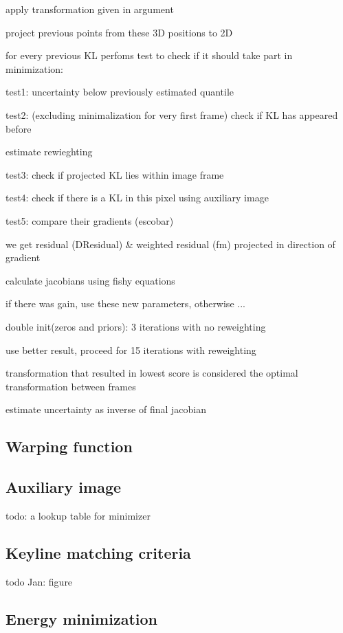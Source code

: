     apply transformation given in argument

    project previous points from these 3D positions to 2D

    for every previous KL perfoms test to check if it should take part in minimization:

       test1: uncertainty below previously estimated quantile

	 test2: (excluding minimalization for very first frame) check if KL has appeared before

     estimate rewieghting

	 test3: check if projected KL lies within image frame

       test4: check if there is a KL in this pixel using auxiliary image

       test5: compare their gradients (escobar)

       we get residual (DResidual) \& weighted residual (fm) projected in direction of gradient

     calculate jacobians using fishy equations

     if there was gain, use these new parameters, otherwise ...

double init(zeros and priors): 3 iterations with no reweighting

use better result, proceed for 15 iterations with reweighting

transformation that resulted in lowest score is considered the optimal transformation between frames

estimate uncertainty as inverse of final jacobian

\subsection{Warping function}

\subsection{Auxiliary image}

todo: a lookup table for minimizer

\subsection{Keyline matching criteria}

todo Jan: figure

\subsection{Energy minimization}

